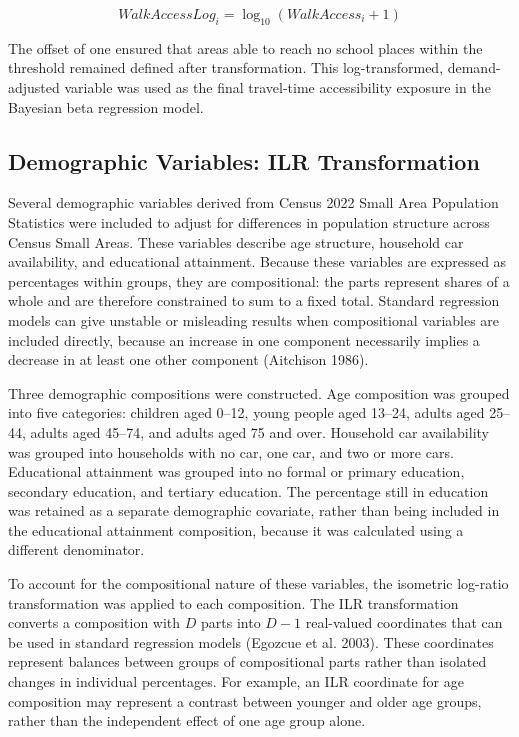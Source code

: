 \documentclass{article}
\begin{document}
\[
WalkAccessLog_i = \log_{10}\left(WalkAccess_i + 1\right)
\]

The offset of one ensured that areas able to reach no school places
within the threshold remained defined after transformation. This
log-transformed, demand-adjusted variable was used as the final
travel-time accessibility exposure in the Bayesian beta regression
model.

\subsection{Demographic Variables: ILR
Transformation}\label{demographic-variables-ilr-transformation}

Several demographic variables derived from Census 2022 Small Area
Population Statistics were included to adjust for differences in
population structure across Census Small Areas. These variables describe
age structure, household car availability, and educational attainment.
Because these variables are expressed as percentages within groups, they
are compositional: the parts represent shares of a whole and are
therefore constrained to sum to a fixed total. Standard regression
models can give unstable or misleading results when compositional
variables are included directly, because an increase in one component
necessarily implies a decrease in at least one other component
(Aitchison 1986).

Three demographic compositions were constructed. Age composition was
grouped into five categories: children aged 0--12, young people aged
13--24, adults aged 25--44, adults aged 45--74, and adults aged 75 and
over. Household car availability was grouped into households with no
car, one car, and two or more cars. Educational attainment was grouped
into no formal or primary education, secondary education, and tertiary
education. The percentage still in education was retained as a separate
demographic covariate, rather than being included in the educational
attainment composition, because it was calculated using a different
denominator.

To account for the compositional nature of these variables, the
isometric log-ratio transformation was applied to each composition. The
ILR transformation converts a composition with \(D\) parts into
\(D - 1\) real-valued coordinates that can be used in standard
regression models (Egozcue et al. 2003). These coordinates represent
balances between groups of compositional parts rather than isolated
changes in individual percentages. For example, an ILR coordinate for
age composition may represent a contrast between younger and older age
groups, rather than the independent effect of one age group alone.
\end{document}
